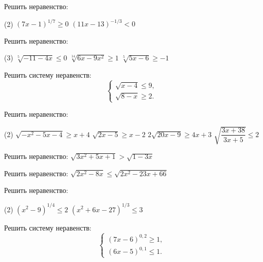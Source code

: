 \begin{class}[number=3]
	\begin{listofex}
		\item Решить неравенство:
		\begin{tasks}(2)
			\task \( (7x-1)^{1/7}\ge0 \)
			\task \( (11x-13)^{-1/3}<0 \)
		\end{tasks}
		\item Решить неравенство:
		\begin{tasks}(3)
			\task \( \sqrt[5]{-11-4x}\le0 \)
			\task \( \sqrt[14]{6x-9x^2}\ge1 \)
			\task \( \sqrt[5]{5x-6}\ge-1 \)
		\end{tasks}
		\item Решить систему неравенств:
		\[ \left\{
		\begin{array}{l}
			\sqrt{x-4}\le9,\\
			\sqrt{8-x}\ge2.
		\end{array}
		\right. \]
		\item Решить неравенство:
		\begin{tasks}(2)
			\task \( \sqrt{-x^2-5x-4}\ge x+4 \)
			\task \( \sqrt{2x-5}\ge x-2 \)
			\task \( 2\sqrt{20x-9}\ge 4x+3 \)
			\task \( \sqrt{\dfrac{3x+38}{3x+5}}\le2 \)
		\end{tasks}
		\item Решить неравенство: \( \sqrt{3x^2+5x+1}>\sqrt{1-3x} \)
		\item Решить неравенство: \( \sqrt{2x^2-8x}\le\sqrt{2x^2-23x+66} \)
		\item Решить неравенство:
		\begin{tasks}(2)
			\task \( (x^2-9)^{1/4}\le2 \)
			\task \( (x^2+6x-27)^{1/3}\le3 \)
		\end{tasks}
		\item Решить систему неравенств:
		\[ \left\{
		\begin{array}{l}
			(7x-6)^{0,2}\ge1,\\
			(6x-5)^{0,1}\le1.
		\end{array}
		\right. \]
	\end{listofex}
\end{class}

